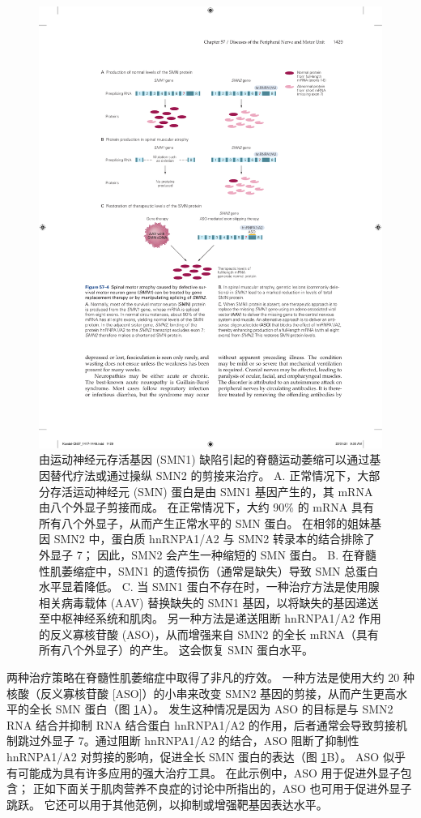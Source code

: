 \begin{figure}[htbp]
	\centering
	\includegraphics[width=0.8\linewidth]{chap57/fig_57_4}
	\caption{由运动神经元存活基因 (SMN1) 缺陷引起的脊髓运动萎缩可以通过基因替代疗法或通过操纵 SMN2 的剪接来治疗。 A. 正常情况下，大部分存活运动神经元 (SMN) 蛋白是由 SMN1 基因产生的，其 mRNA 由八个外显子剪接而成。 在正常情况下，大约 90\% 的 mRNA 具有所有八个外显子，从而产生正常水平的 SMN 蛋白。 在相邻的姐妹基因 SMN2 中，蛋白质 hnRNPA1/A2 与 SMN2 转录本的结合排除了外显子 7； 因此，SMN2 会产生一种缩短的 SMN 蛋白。 B. 在脊髓性肌萎缩症中，SMN1 的遗传损伤（通常是缺失）导致 SMN 总蛋白水平显着降低。 C. 当 SMN1 蛋白不存在时，一种治疗方法是使用腺相关病毒载体 (AAV) 替换缺失的 SMN1 基因，以将缺失的基因递送至中枢神经系统和肌肉。 另一种方法是递送阻断 hnRNPA1/A2 作用的反义寡核苷酸 (ASO)，从而增强来自 SMN2 的全长 mRNA（具有所有八个外显子）的产生。 这会恢复 SMN 蛋白水平。}
	\label{fig:57_4}
\end{figure}

两种治疗策略在脊髓性肌萎缩症中取得了非凡的疗效。 一种方法是使用大约 20 种核酸（反义寡核苷酸 [ASO]）的小串来改变 SMN2 基因的剪接，从而产生更高水平的全长 SMN 蛋白（图 \ref{fig:57_4}A）。 发生这种情况是因为 ASO 的目标是与 SMN2 RNA 结合并抑制 RNA 结合蛋白 hnRNPA1/A2 的作用，后者通常会导致剪接机制跳过外显子 7。通过阻断 hnRNPA1/A2 的结合，ASO 阻断了抑制性 hnRNPA1/A2 对剪接的影响，促进全长 SMN 蛋白的表达（图 \ref{fig:57_4}B）。 ASO 似乎有可能成为具有许多应用的强大治疗工具。 在此示例中，ASO 用于促进外显子包含； 正如下面关于肌肉营养不良症的讨论中所指出的，ASO 也可用于促进外显子跳跃。 它还可以用于其他范例，以抑制或增强靶基因表达水平。

